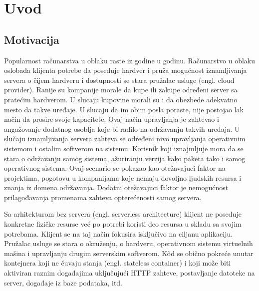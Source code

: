 \documentclass[12pt,oneside]{memoir}
\begin{document}
\frontmatter
\naslovna
\komisija
\apstrakt
\tableofcontents*

\mainmatter

\chapter{Uvod}

\section{Motivacija}
Popularnost računarstva u oblaku raste iz godine u godinu. Računarstvo u oblaku oslobađa klijenta potrebe da poseduje hardver i pruža mogućnost iznamljivanja servera o čijem hardveru i dostupnosti se stara pružalac usluge (engl. cloud provider). Ranije su kompanije morale da kupe ili zakupe određeni server sa pratećim hardverom. U slucaju kupovine morali su i da obezbede adekvatno mesto da takve uređaje. U slucaju da im obim posla poraste, nije postojao lak način da prosire svoje kapacitete. Ovaj način upravljanja je zahtevao i angažovanje dodatnog osoblja koje bi radilo na održavanju takvih uređaja. U slučaju iznamljivanja servera zahteva se određeni nivo upravljanja operativnim sistemom i ostalim softverom na sistemu. Korisnik koji iznajmljuje mora da se stara o održavanju samog sistema, ažuriranju verzija kako paketa tako i samog operativnog sistema. Ovaj scenario se pokazao kao otežavajuci faktor na projektima, pogotovu u kompanijama koje nemaju dovoljno ljudskih resursa i znanja iz domena održavanja. Dodatni otežavajuci faktor je nemogućnost prilagođavanja promenama zahteva opterećenosti samog servera. 

Sa arhitekturom bez servera (engl. serverless architecture) klijent ne poseduje konkretne fizičke resurse već po potrebi koristi deo resursa u skladu sa svojim potrebama. Klijent se na taj način fokusira isključivo na ciljanu aplikaciju. Pružalac usluge se stara o okruženju, o hardveru, operativnom sistemu virtuelnih mašina i upravljanju drugim serverskim softverom. Kôd se obično pokreće unutar kontejnera koji ne čuvaju stanja (engl. stateless container) i koji može biti aktiviran raznim događajima uključujući HTTP zahteve, postavljanje datoteke na server, događaje iz baze podataka, itd.
\end{document}
